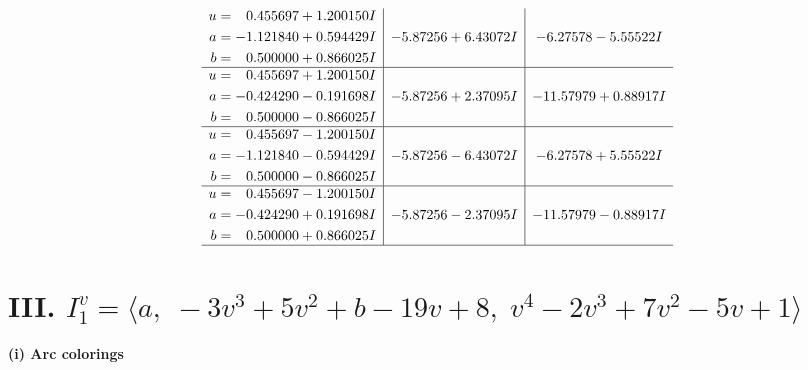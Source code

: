 \documentclass[1p]{elsarticle_modified}
\theoremstyle{definition}
\begin{document}
$$\begin{array}{c|c|c}
\begin{aligned}
u &= \phantom{-}0.455697 + 1.200150 I \\
a &= -1.121840 + 0.594429 I \\
b &= \phantom{-}0.500000 + 0.866025 I\end{aligned}
 & -5.87256 + 6.43072 I & -6.27578 - 5.55522 I \\ \hline\begin{aligned}
u &= \phantom{-}0.455697 + 1.200150 I \\
a &= -0.424290 - 0.191698 I \\
b &= \phantom{-}0.500000 - 0.866025 I\end{aligned}
 & -5.87256 + 2.37095 I & -11.57979 + 0.88917 I \\ \hline\begin{aligned}
u &= \phantom{-}0.455697 - 1.200150 I \\
a &= -1.121840 - 0.594429 I \\
b &= \phantom{-}0.500000 - 0.866025 I\end{aligned}
 & -5.87256 - 6.43072 I & -6.27578 + 5.55522 I \\ \hline\begin{aligned}
u &= \phantom{-}0.455697 - 1.200150 I \\
a &= -0.424290 + 0.191698 I \\
b &= \phantom{-}0.500000 + 0.866025 I\end{aligned}
 & -5.87256 - 2.37095 I & -11.57979 - 0.88917 I\\
 \hline 
 \end{array}$$\newpage\newpage\renewcommand{\arraystretch}{1}
\centering \section*{III. $I^v_{1}= \langle a,\;-3 v^3+5 v^2+b-19 v+8,\;v^4-2 v^3+7 v^2-5 v+1 \rangle$}
\flushleft \textbf{(i) Arc colorings}\\
\end{document}
